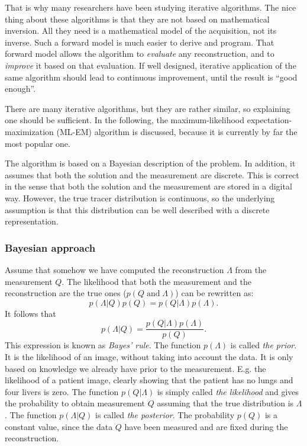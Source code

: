 \documentclass[11pt,oneside]{book}
\begin{document}
That is why many researchers have been studying iterative algorithms. The nice
thing about these algorithms is that they are not based on mathematical
inversion.  All they need is a mathematical model of the acquisition, not its
inverse. Such a forward model is much easier to derive and program. That
forward model allows the algorithm to {\em evaluate} any reconstruction, and
to {\em improve} it based on that evaluation. If well designed, iterative
application of the same algorithm should lead to continuous improvement, until
the result is ``good enough''.

There are many iterative algorithms, but they are rather similar, so
explaining one should be sufficient. In the following, the maximum-likelihood
expectation-maximization (ML-EM) algorithm is discussed, because it is
currently by far the most popular one.

The algorithm is based on a Bayesian description of the problem. In
addition, it assumes that both the solution and the measurement are
discrete. This is correct in the sense that both the solution and the
measurement are stored in a digital way. However, the true tracer
distribution is continuous, so the underlying assumption is that this
distribution can be well described with a discrete representation.

\subsubsection{Bayesian approach} \label{sec:bayes}
Assume that somehow we have computed the reconstruction $\Lambda$ from the
measurement $Q$. The likelihood that both the measurement and the
reconstruction are the true ones ($p(Q \; \mbox{and} \; \Lambda)$) can be
rewritten as:
\begin{equation}
  p(\Lambda | Q) p(Q) = p(Q | \Lambda) p(\Lambda).
\end{equation}
It follows that
\begin{equation}
   p(\Lambda | Q) = \frac{p(Q | \Lambda) p(\Lambda)}{p(Q)}. \label{eq:jnpost}
\end{equation}
This expression is known as {\em Bayes' rule}. The function
$p(\Lambda)$ is called {\em the prior}. It is the likelihood of an
image, without taking into account the data. It is only based on
knowledge we already have prior to the measurement. E.g. the
likelihood of a patient image, clearly showing that the patient has no
lungs and four livers is zero. The function $p(Q | \Lambda)$ is simply
called {\em the likelihood} and gives the probability to obtain
measurement $Q$ assuming that the true distribution is $\Lambda$. The
function $p(\Lambda | Q)$ is called {\em the posterior}. The
probability $p(Q)$ is a constant value, since the data $Q$ have been
measured and are fixed during the reconstruction.
\end{document}
